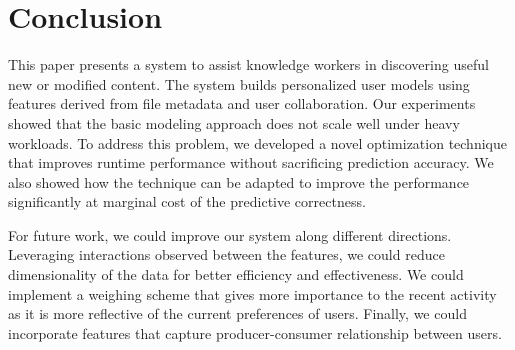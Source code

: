 \section{Conclusion}
\label{sec:conclusion}

This paper presents a system to assist knowledge workers in
discovering useful new or modified content.  The system builds
personalized user models using features derived from file metadata and
user collaboration.  Our experiments showed that the basic modeling
approach does not scale well under heavy workloads. To address this
problem, we developed a novel optimization technique that improves
runtime performance without sacrificing prediction accuracy.  We also
showed how the technique can be adapted to improve the performance
significantly at marginal cost of the predictive correctness.

For future work, we could improve our system along different
directions.  Leveraging interactions observed between the features, we
could reduce dimensionality of the data for better efficiency and
effectiveness.  We could implement a weighing scheme that gives more
importance to the recent activity as it is more reflective of the
current preferences of users.  Finally, we could incorporate features
that capture producer-consumer relationship between users.


